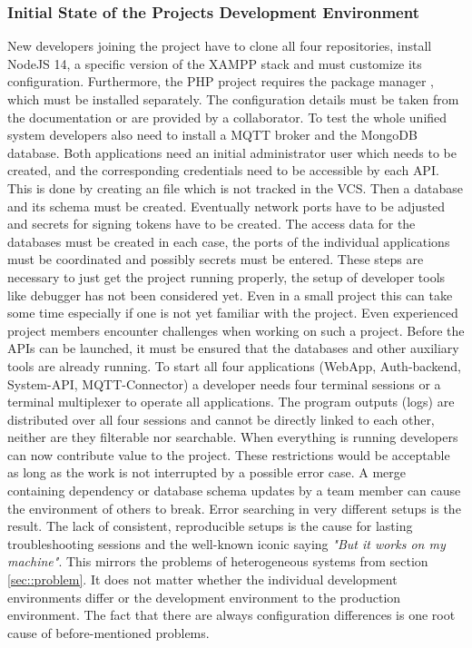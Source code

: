         \subsubsection{Initial State of the Projects Development Environment}
        New developers joining the project have to clone all four repositories, install NodeJS 14, a specific version of the \ac{XAMPP} stack and must customize its configuration. Furthermore, the PHP project requires the package manager , which must be installed separately. The configuration details must be taken from the documentation or are provided by a collaborator. To test the whole unified system developers also need to install a MQTT broker and the MongoDB database. Both applications need an initial administrator user which needs to be created, and the corresponding credentials need to be accessible by each \ac{API}. This is done by creating an  file which is not tracked in the \ac{VCS}. Then a database and its schema must be created. Eventually network ports have to be adjusted and secrets for signing tokens have to be created.
        The access data for the databases must be created in each case, the ports of the individual applications must be coordinated and possibly secrets must be entered. These steps are necessary to just get the project running properly, the setup of developer tools like debugger has not been considered yet. Even in a small project this can take some time especially if one is not yet familiar with the project.\newline
        Even experienced project members encounter challenges when working on such a project. Before the APIs can be launched, it must be ensured that the databases and other auxiliary tools are already running. To start all four applications (WebApp, Auth-backend, System-API, MQTT-Connector) a developer needs four terminal sessions or a terminal multiplexer to operate all applications. The program outputs (logs) are distributed over all four sessions and cannot be directly linked to each other, neither are they filterable nor searchable. When everything is running developers can now contribute value to the project. These restrictions would be acceptable as long as the work is not interrupted by a possible error case. A merge containing dependency or database schema updates by a team member can cause the environment of others to break. Error searching in very different setups is the result. The lack of consistent, reproducible setups is the cause for lasting troubleshooting sessions and the well-known iconic saying \textit{"But it works on my machine"}. This mirrors the problems of heterogeneous systems from section \ref{sec::problem}. It does not matter whether the individual development environments differ or the development environment to the production environment. The fact that there are always configuration differences is one root cause of before-mentioned problems. \newline
